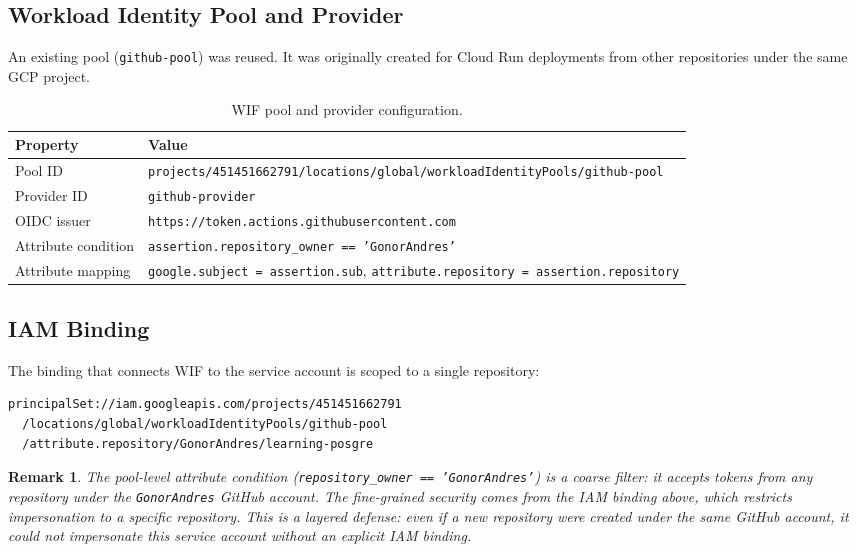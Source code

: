 \documentclass[11pt,a4paper]{article}
\theoremstyle{plainref}
\newtheorem{remark}[definition]{Remark}
\begin{document}
\subsection{Workload Identity Pool and Provider}

An existing pool (\texttt{github-pool}) was reused. It was originally created for Cloud Run deployments from other repositories under the same GCP project.

\begin{table}[h]
\centering
\caption{WIF pool and provider configuration.}
\begin{tabular}{@{}lp{9cm}@{}}
\toprule
\textbf{Property} & \textbf{Value} \\
\midrule
Pool ID & \texttt{projects/451451662791/locations/global/workloadIdentityPools/github-pool} \\
Provider ID & \texttt{github-provider} \\
OIDC issuer & \texttt{https://token.actions.githubusercontent.com} \\
Attribute condition & \texttt{assertion.repository\_owner == 'GonorAndres'} \\
Attribute mapping & \texttt{google.subject = assertion.sub}, \texttt{attribute.repository = assertion.repository} \\
\bottomrule
\end{tabular}
\end{table}

\subsection{IAM Binding}

The binding that connects WIF to the service account is scoped to a single repository:

\begin{verbatim}
principalSet://iam.googleapis.com/projects/451451662791
  /locations/global/workloadIdentityPools/github-pool
  /attribute.repository/GonorAndres/learning-posgre
\end{verbatim}

\begin{remark}
The pool-level attribute condition (\texttt{repository\_owner == 'GonorAndres'})
is a coarse filter: it accepts tokens from any repository under the
\texttt{GonorAndres} GitHub account. The fine-grained security comes from the
IAM binding above, which restricts impersonation to a specific repository.
This is a layered defense: even if a new repository were created under the same
GitHub account, it could not impersonate this service account without an
explicit IAM binding.
\end{remark}
\end{document}
